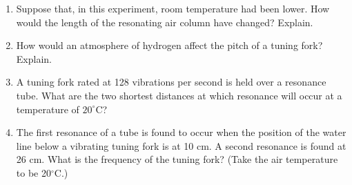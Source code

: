 \vskip35pt


\begin{enumerate}
\item Suppose that, in this experiment, room temperature had been lower. How would
the length of the resonating air column have changed? Explain. \vspace{20mm}

\item How would an atmosphere of hydrogen affect the pitch of a tuning fork? Explain.\vspace{20mm}

\item A tuning fork rated at 128 vibrations per second is held over a resonance tube.
What are the two shortest distances at which resonance will occur at a temperature
of $20^\circ$C?\vspace{20mm}

\item The first resonance of a tube is found to occur when the position of the water
line below a vibrating tuning fork is at 10 cm. A second resonance is found
at 26 cm. What is the frequency of the tuning fork? (Take the air temperature
to be 20$^\circ$C.)
\end{enumerate}
